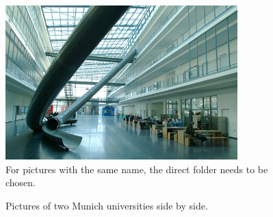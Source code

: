 \begin{figure}[htpb]
    \centering
    \includegraphics[width=0.8\textwidth]{figures/tum.jpg}
    \caption{For pictures with the same name, the direct folder needs to be chosen.} \label{fig:tumslide}
\end{figure}

\begin{figure}[!tbp]
    \centering
    \hfill
    \caption{Pictures of two Munich universities side by side.}
    \label{fig:sidebyside}
\end{figure}

